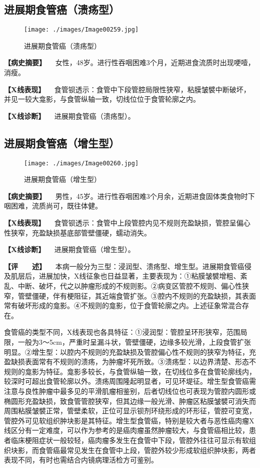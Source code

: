 \subsection{进展期食管癌（溃疡型）}

\begin{figure}[!htbp]
 \centering
 \texttt{[image: ./images/Image00259.jpg]}
 \captionsetup{justification=centering}
 \caption{进展期食管癌（溃疡型）}
 \label{fig5-2-16}
  \end{figure} 

\textbf{【病史摘要】}
　女性，48岁。进行性吞咽困难3个月，近期进食流质时出现哽噎，消瘦。

\textbf{【X线表现】}
　食管钡透示：食管中下段管腔局限性狭窄，粘膜皱襞中断破坏，并见一较大龛影，与食管纵轴一致，切线位位于食管轮廓之内。

\textbf{【X线诊断】} 　进展期食管癌（溃疡型）。

\subsection{进展期食管癌（增生型）}

\begin{figure}[!htbp]
 \centering
 \texttt{[image: ./images/Image00260.jpg]}
 \captionsetup{justification=centering}
 \caption{进展期食管癌（增生型）}
 \label{fig5-2-17}
  \end{figure} 

\textbf{【病史摘要】}
　男性，45岁。进行性吞咽困难3个月余，近期进食固体类食物时下咽困难，流质尚可，既往体健。

\textbf{【X线表现】}
　食管钡透示：食管中上段管腔内见不规则充盈缺损，管腔呈偏心性狭窄，充盈缺损基底部管壁僵硬，蠕动消失。

\textbf{【X线诊断】} 　进展期食管癌（增生型）。

\textbf{【评　　述】}
　本病一般分为三型：浸润型、溃疡型、增生型。进展期食管癌侵及肌层后，进展加快，X线征象也日益显著，主要表现为：①粘膜皱襞增粗、紊乱、中断、破坏，代之以肿瘤形成的不规则影。②病变区管腔不规则、偏心性狭窄，管壁僵硬，伴有梗阻征，其近端食管扩张。③腔内不规则的充盈缺损，其表面常有破坏形成的龛影。④不规则的龛影，位于食管轮廓之内。上述征象常混合存在。

食管癌的类型不同，X线表现也各具特征：①浸润型：管腔呈环形狭窄，范围局限，一般为3～5cm，严重时呈漏斗状，管壁僵硬，边缘多较光滑，上段食管扩张明显。②增生型：以腔内不规则的充盈缺损及管腔偏心性不规则的狭窄为特征，充盈缺损表面常有不规则的溃疡，为肿瘤坏死所致。③溃疡型：以边界清楚、形态不规则的龛影为特征。龛影多较长，与食管纵轴一致，在切线位多在食管轮廓线内，较深时可超出食管轮廓以外。溃疡周围隆起明显者，可见环堤征。增生型食管癌需注意与良性肿瘤中最多见的平滑肌瘤相鉴别，后者切线位也可表现为管腔内圆形或椭圆形充盈缺损，致食管管腔狭窄，但其边缘一般光滑、肿瘤区粘膜皱襞可消失而周围粘膜皱襞正常，管壁柔软，正位可显示钡剂环绕形成的环形征，管腔可变宽，管腔外可见软组织肿块影是其特征。增生型食管癌，特别是较大者与恶性癌肉瘤X线区分有一定难度，可以作为参考的是癌肉瘤虽然肿瘤较大，与食管癌相比较，患者临床梗阻症状一般较轻，癌肉瘤多发生在食管中下段，管腔外往往可显示有软组织块影，而食管癌最常见发生在食管中上段，管腔外较少形成软组织肿块影，两者表现不同，有时也需结合内镜病理活检方可鉴别。

